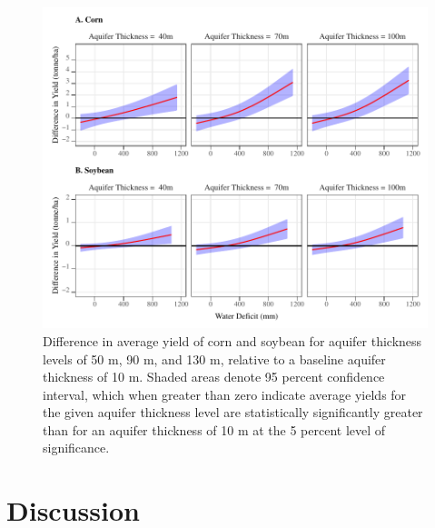 \documentclass[
]{article}
\begin{document}
\begin{figure}[H]

{\centering \includegraphics[width=6in,]{Figures/g_avg_yield_dif} 

}

\caption{Difference in average yield of corn and soybean for aquifer thickness levels of 50 m, 90 m, and 130 m, relative to a baseline aquifer thickness of 10 m. Shaded areas denote 95 percent confidence interval, which when greater than zero indicate average yields for the given aquifer thickness level are statistically significantly greater than for an aquifer thickness of 10 m at the 5 percent level of significance.}\label{fig:dif-tot-impact}
\end{figure}

\clearpage

\hypertarget{discussion}{%
\section{Discussion}\label{discussion}}
\end{document}

